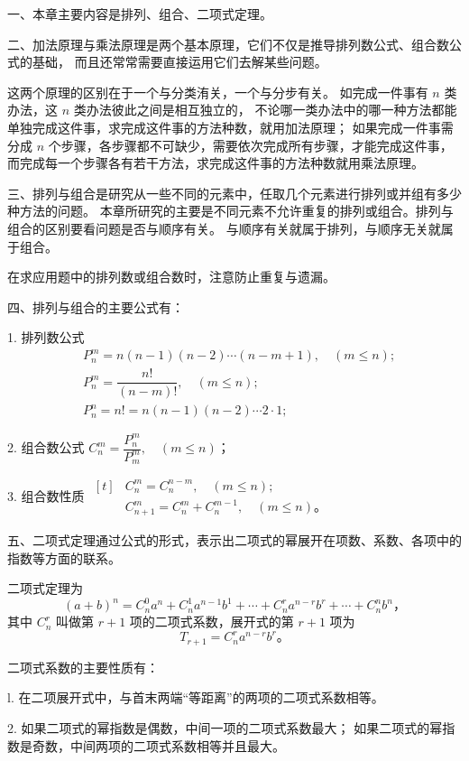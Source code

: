 \xiaojie

一、本章主要内容是排列、组合、二项式定理。


二、加法原理与乘法原理是两个基本原理，它们不仅是推导排列数公式、组合数公式的基础，
而且还常常需要直接运用它们去解某些问题。

这两个原理的区别在于一个与分类洧关，一个与分步有关。
如完成一件事有 $n$ 类办法，这 $n$ 类办法彼此之间是相互独立的，
不论哪一类办法中的哪一种方法都能单独完成这件事，求完成这件事的方法种数，就用加法原理；
如果完成一件事需分成 $n$ 个步骤，各步骤都不可缺少，需要依次完成所有步骤，才能完成这件事，
而完成每一个步骤各有若干方法，求完成这件事的方法种数就用乘法原理。


三、排列与组合是研究从一些不同的元素中，任取几个元素进行排列或并组有多少种方法的问题。
本章所研究的主要是不同元素不允许重复的排列或组合。排列与组合的区别要看问题是否与顺序有关。
与顺序有关就属于排列，与顺序无关就属于组合。

在求应用题中的排列数或组合数时，注意防止重复与遗漏。


四、排列与组合的主要公式有：

1. 排列数公式
\begin{align*}
    & P_n^m = n (n-1) (n-2) \cdots (n-m+1), \quad (m \leqslant n); \\
    & P_n^m = \dfrac{n!}{(n-m)!}, \quad (m \leqslant n); \\
    & P_n^n = n! = n (n-1) (n-2) \cdots 2 \cdot 1;
\end{align*}


2. 组合数公式 \quad $C_n^m = \dfrac{P_n^m}{P_m^m},\quad (m \leqslant n)$；


3. 组合数性质 \quad $\begin{aligned}[t]
    & C_n^m = C_n^{n-m}, \quad (m \leqslant n); \\
    & C_{n+1}^m = C_n^m + C_n^{m-1}, \quad (m \leqslant n) \text{。}
\end{aligned}$



五、二项式定理通过公式的形式，表示出二项式的幂展开在项数、系数、各项中的指数等方面的联系。


二项式定理为
$$ (a + b)^n = C_n^0 a^n + C_n^1 a^{n-1}b^1 + \cdots + C_n^r a^{n-r}b^r + \cdots + C_n^n b^n \text{，} $$
其中 $C_n^r$ 叫做第 $r+1$ 项的二项式系数，展开式的第 $r+1$ 项为
$$ T_{r+1} = C_n^r a^{n-r} b^r \text{。} $$

二项式系数的主要性质有：

l. 在二项展开式中，与首末两端“等距离”的两项的二项式系数相等。

2. 如果二项式的幂指数是偶数，中间一项的二项式系数最大；
如果二项式的幂指数是奇数，中间两项的二项式系数相等并且最大。

